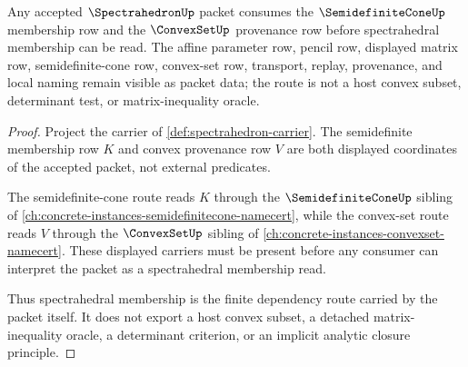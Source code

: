 \begin{theorem}
\label{thm:spectrahedron-semidefinite-cone-dependency-route}
Any accepted $\SpectrahedronUp$ packet consumes the $\SemidefiniteConeUp$ membership row and the $\ConvexSetUp$ provenance row before spectrahedral membership can be read. The affine parameter row, pencil row, displayed matrix row, semidefinite-cone row, convex-set row, transport, replay, provenance, and local naming remain visible as packet data; the route is not a host convex subset, determinant test, or matrix-inequality oracle.
\end{theorem}
\begin{proof}
Project the carrier of \autoref{def:spectrahedron-carrier}. The semidefinite membership row $K$ and convex provenance row $V$ are both displayed coordinates of the accepted packet, not external predicates.

The semidefinite-cone route reads $K$ through the $\SemidefiniteConeUp$ sibling of \autoref{ch:concrete-instances-semidefinitecone-namecert}, while the convex-set route reads $V$ through the $\ConvexSetUp$ sibling of \autoref{ch:concrete-instances-convexset-namecert}. These displayed carriers must be present before any consumer can interpret the packet as a spectrahedral membership read.

Thus spectrahedral membership is the finite dependency route carried by the packet itself. It does not export a host convex subset, a detached matrix-inequality oracle, a determinant criterion, or an implicit analytic closure principle.
\end{proof}
